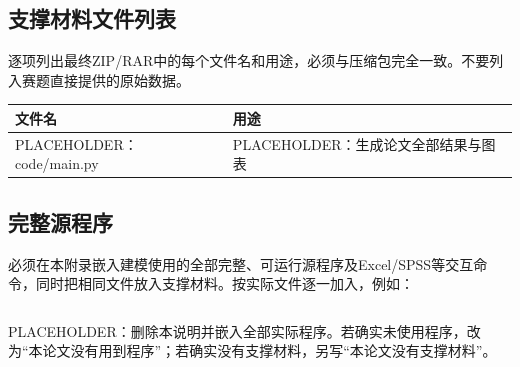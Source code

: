 \vspace{1.1em}

\subsection*{支撑材料文件列表}

逐项列出最终ZIP/RAR中的每个文件名和用途，必须与压缩包完全一致。不要列入赛题直接提供的原始数据。

\begin{center}
\begin{tabular}{ll}
\toprule
文件名 & 用途 \\
\midrule
PLACEHOLDER：code/main.py & PLACEHOLDER：生成论文全部结果与图表 \\
\bottomrule
\end{tabular}
\end{center}

\subsection*{完整源程序}

必须在本附录嵌入建模使用的全部完整、可运行源程序及Excel/SPSS等交互命令，同时把相同文件放入支撑材料。按实际文件逐一加入，例如：

\begin{lstlisting}[language=TeX]

\end{lstlisting}

PLACEHOLDER：删除本说明并嵌入全部实际程序。若确实未使用程序，改为“本论文没有用到程序”；若确实没有支撑材料，另写“本论文没有支撑材料”。
